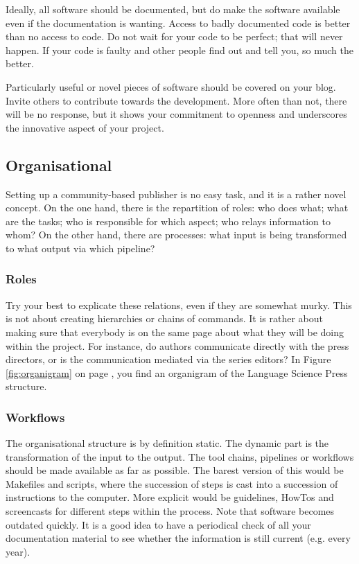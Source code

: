 \documentclass[nonflat,modfonts,output=book] {langsci/langscibook}
\begin{document}
Ideally, all software should be documented, but do make the software available even if the documentation is wanting. Access to badly documented code is better than no access to code. Do not wait for your code to be perfect; that will never happen. If your code is faulty and other people find out and tell you, so much the better.

Particularly useful or novel pieces of software should be covered on your blog. Invite others to contribute towards the development. More often than not, there will be no response, but it shows your commitment to openness and underscores the innovative aspect of your project. 


\subsection{Organisational}
Setting up a community-based publisher is no easy task, and it is a rather novel concept. On the one hand, there is the repartition of roles: who does what; what are the tasks; who is responsible for which aspect; who relays information to whom? On the other hand, there are processes: what input is being transformed to what output via which pipeline?

\subsubsection{Roles}

Try your best to explicate these relations, even if they are somewhat murky. This is not about creating hierarchies or chains of commands. It is rather about making sure that everybody is on the same page about what they will be doing within the project. For instance, do authors communicate directly with the press directors, or is the communication mediated via the series editors? In Figure \ref{fig:organigram} on page \pageref{fig:organigram}, you find an organigram of the Language Science Press structure. 


\subsubsection{Workflows}
The organisational structure is by definition static. The dynamic part is the transformation of the input to the output. The tool chains, pipelines or workflows should be made available as far as possible. The barest version of this would be Makefiles and scripts, where the succession of steps is cast into a succession of instructions to the computer. More explicit would be guidelines, HowTos and screencasts for different steps within the process. Note that software becomes outdated quickly. It is a good idea to have a periodical check of all your documentation material to see whether the information is still current (e.g. every year). 
\end{document}
